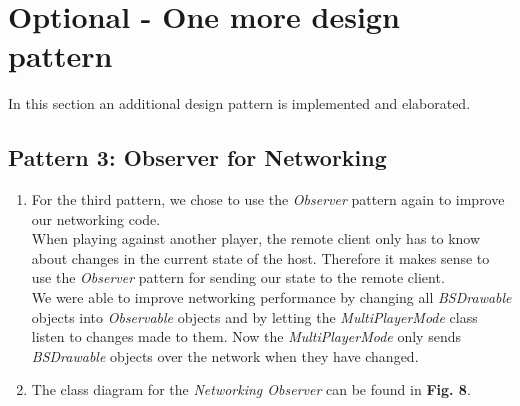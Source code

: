 \documentclass[a4paper,11pt]{article}
\begin{document}
\newpage
\section{Optional - One more design pattern \\}
In this section an additional design pattern is implemented and elaborated.
\subsection{Pattern 3:  Observer for Networking}
\begin{enumerate}
\item For the third pattern, we chose to use the \textit{Observer} pattern again to improve our networking code. \\
When playing against another player, the remote client only has to know about changes in the current state of the host.
Therefore it makes sense to use the \textit{Observer} pattern for sending our state to the remote client. \\
We were able to improve networking performance by changing all \textit{BSDrawable} objects into \textit{Observable} objects and by letting the \textit{MultiPlayerMode} class listen to changes made to them.
Now the \textit{MultiPlayerMode} only sends \textit{BSDrawable} objects over the network when they have changed.

\item The class diagram for the \textit{Networking Observer} can be found in \textbf{Fig. 8}. \\
\begin{minipage}{\linewidth}
\end{minipage}
\end{enumerate}
\end{document}
